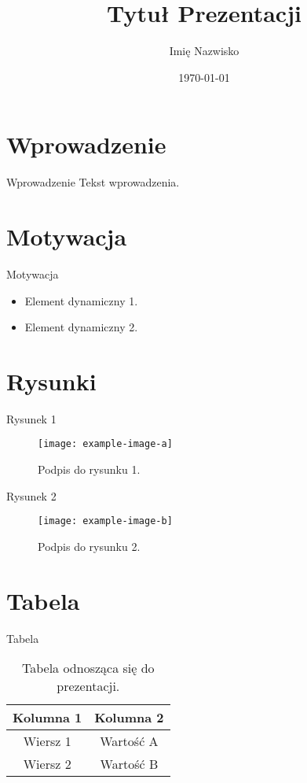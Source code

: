 \documentclass{beamer}
\title{Tytuł Prezentacji}
\author{Imię Nazwisko}
\date{\today}
\begin{document}
\begin{frame}
  \titlepage
\end{frame}

\section{Wprowadzenie}
\begin{frame}{Wprowadzenie}
  Tekst wprowadzenia.
\end{frame}

\section{Motywacja}
\begin{frame}{Motywacja}
  \begin{itemize}
    \item Element dynamiczny 1.
    \item Element dynamiczny 2.
  \end{itemize}
\end{frame}

\section{Rysunki}
\begin{frame}{Rysunek 1}
  \begin{figure}
    \centering
    \texttt{[image: example-image-a]}
    \caption{Podpis do rysunku 1.}
  \end{figure}
\end{frame}

\begin{frame}{Rysunek 2}
  \begin{figure}
    \centering
    \texttt{[image: example-image-b]}
    \caption{Podpis do rysunku 2.}
  \end{figure}
\end{frame}

\section{Tabela}
\begin{frame}{Tabela}
  \begin{table}
    \centering
    \begin{tabular}{|c|c|}
      \hline
      Kolumna 1 & Kolumna 2 \\
      \hline
      Wiersz 1   & Wartość A \\
      Wiersz 2   & Wartość B \\
      \hline
    \end{tabular}
    \caption{Tabela odnosząca się do prezentacji.}
  \end{table}
\end{frame}
\end{document}
